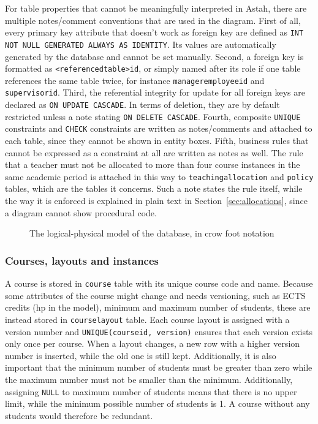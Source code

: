 \documentclass[a4paper]{scrartcl}
\newcommand{\diagrampage}[3]{%
  \newgeometry{margin=10mm}%
  \begin{landscape}%
    \vspace*{\fill}
    \begin{figure}[h!]
      \centering
      
      \caption{#2}
      \label{#3}
    \end{figure}%
    \vspace*{\fill}
  \end{landscape}%
  \restoregeometry%
}
\renewcommand{\_}{\textunderscore\allowbreak}
\begin{document}
For table properties that cannot be meaningfully interpreted in Astah, there are multiple notes/comment conventions that are used in the diagram. First of all, every primary key attribute that doesn't work as foreign key are defined as \texttt{INT NOT NULL GENERATED ALWAYS AS IDENTITY}. Its values are automatically generated by the database and cannot be set manually. Second, a foreign key is formatted as \texttt{<referenced\_table>\_id}, or simply named after its role if one table references the same table twice, for instance \texttt{manager\_employee\_id} and \texttt{supervisor\_id}. Third, the referential integrity for update for all foreign keys are declared as \texttt{ON UPDATE CASCADE}. In terms of deletion, they are by default restricted unless a note stating \texttt{ON DELETE CASCADE}. Fourth, composite \texttt{UNIQUE} constraints and \texttt{CHECK} constraints are written as notes/comments and attached to each table, since they cannot be shown in entity boxes. Fifth, business rules that cannot be expressed as a constraint at all are written as notes as well. The rule that a teacher must not be allocated to more than four course instances in the same academic period is attached in this way to \texttt{teaching\_allocation} and \texttt{policy} tables, which are the tables it concerns. Such a note states the rule itself, while the way it is enforced is explained in plain text in Section~\ref{sec:allocations}, since a diagram cannot show procedural code.

\diagrampage{diagrams/logical-physical}{The logical-physical model of the database, in crow foot notation}{fig:logical}

\subsubsection{Courses, layouts and instances}

A course is stored in \texttt{course} table with its unique course code and name. Because some attributes of the course might change and needs versioning, such as ECTS credits (hp in the model), minimum and maximum number of students, these are instead stored in \texttt{course\_layout} table. Each course layout is assigned with a version number and \texttt{UNIQUE(course\_id, version)} ensures that each version exists only once per course. When a layout changes, a new row with a higher version number is inserted, while the old one is still kept. Additionally, it is also important that the minimum number of students must be greater than zero while the maximum number must not be smaller than the minimum. Additionally, assigning \texttt{NULL} to maximum number of students means that there is no upper limit, while the minimum possible number of students is 1. A course without any students would therefore be redundant.
\end{document}
